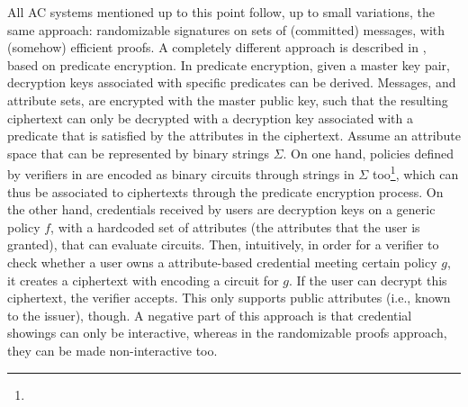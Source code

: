All AC systems mentioned up to this point follow, up to small variations, the
same approach: randomizable signatures on sets of (committed) messages, with
(somehow) efficient proofs. A completely different approach is described in
\cite{dmm+18}, based on predicate encryption. In predicate encryption, given
a master key pair, decryption keys associated with specific predicates can be
derived. Messages, and attribute sets, are encrypted with the master public key,
such that the resulting ciphertext can only be decrypted with a decryption key
associated with a predicate that is satisfied by the attributes in the
ciphertext. Assume an attribute space that can be represented by binary strings
$\Sigma$. On one hand, policies defined by verifiers in \cite{dmm+18} are encoded
as binary circuits through strings in $\Sigma$ too\footnote{}, which can thus be associated to
ciphertexts through the predicate encryption process. On the other hand,
credentials received by users are decryption keys on a generic policy $f$, with
a hardcoded set of attributes (the attributes that the user is granted), that
can evaluate circuits. Then, intuitively, in order for a verifier to check
whether a user owns a attribute-based credential meeting certain policy $g$, it
creates a ciphertext with encoding a circuit for $g$. If the user can decrypt
this ciphertext, the verifier accepts. This only supports public attributes
(i.e., known to the issuer), though. A negative part of this approach is that
credential showings can only be interactive, whereas in the randomizable proofs
approach, they can be made non-interactive too.

